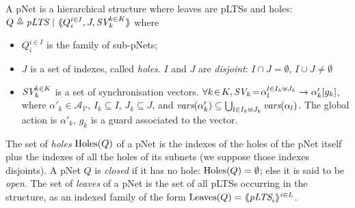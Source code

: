 \documentclass{llncs}
\newcommand{\cA}{\ensuremath{\mathcal{A}}}
\newcommand{\cV}{\ensuremath{\mathcal{V}}}
\newcommand{\variables}{\ensuremath{\cV}}
\newcommand{\actions}[1]{\ensuremath{\cA_{#1}}}
\begin{document}
\begin{definition}[pNets]\label{defn:pnets}
A pNet is a hierarchical structure where leaves are pLTSs and holes: %
$Q\triangleq \pLTS~|~\mylangle Q_i^{i\in I}, J, \symb{SV}_k^{k\in 
K}\myrangle$
where\\[-3.5ex]
\begin{itemize}
\item $Q_i^{i\in I}$ is the family of sub-pNets;

\item $J$ is a set of indexes, called \emph{holes}.
$I$ and $J$ are \emph{disjoint}: $I\!\cap\! J=\emptyset$,  $I\!\cup\! J\neq\emptyset$

\item $\symb{SV}_k^{k\in K}$ is a set of
  synchronisation vectors. %
$\forall k\!\in\! K,
  \symb{SV}_k\!=\SV{\!\alpha_{l}^{l\in I_k \uplus J_k}}{\alpha'_k}{g_k}$, where
  $\alpha'_k\in \actions{\variables}$, $I_k\subseteq I$, $J_k\subseteq J$, and 
  $\vars(\alpha'_k)\subseteq \bigcup_{l\in I_k\uplus 
  J_k}{\vars({\alpha_l})}$. The global action  is
$\alpha'_k$,  $g_k$ is a guard associated to the vector.


\end{itemize}
The set of \emph{holes} $\operatorname{Holes}(Q)$ of a pNet is the indexes of the holes of the pNet 
itself plus the indexes of all the holes of its subnets (we suppose those indexes 
disjoints). A pNet $Q$ is \emph{closed} if it has no hole: $\operatorname{Holes}(Q)=\emptyset$; else it
is said to be \emph{open}.
%
The set of \emph{leaves} of a pNet is the set of all pLTSs occurring in the structure, as an 
indexed family of the form $\Leaves(Q)= \mylangle \pLTS_i \myrangle^{i \in L}$.

\end{definition}
\end{document}
